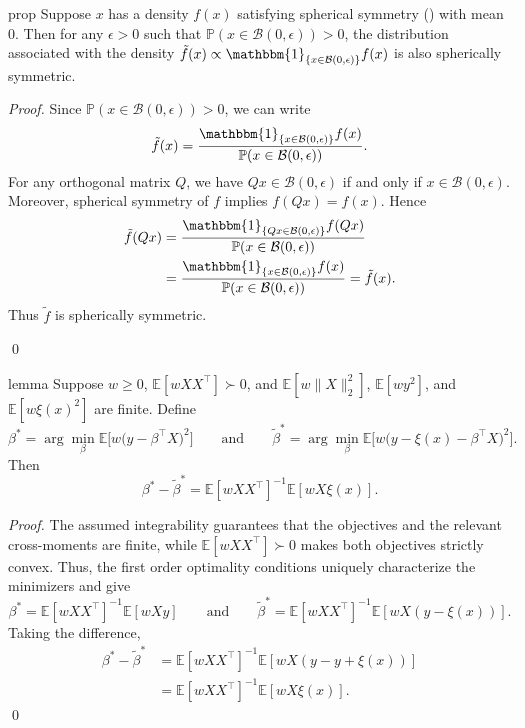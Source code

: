 \documentclass[11pt]{article}
\begin{document}
\begin{appendices}
\begin{restatable}{prop}{} \label{prop: conditional spherical symmetry}
    Suppose $x$ has a density $f(x)$ satisfying spherical symmetry () with mean $0$. Then for any $\epsilon > 0$ such that $\mathbb{P}(x\in\mathcal{B}(0,\epsilon))>0$, the distribution associated with the density $\tilde{f}(x) \propto \mathbbm{1}_{\{x \in \mathcal{B}(0, \epsilon)\}}f(x)$ is also spherically symmetric.
\end{restatable}
\noindent \textit{Proof.} Since $\mathbb{P}(x\in\mathcal{B}(0,\epsilon))>0$, we can write
\[
    \tilde f(x)
    =
    \frac{\mathbbm{1}_{\{x\in\mathcal{B}(0,\epsilon)\}}f(x)}
    {\mathbb{P}(x\in\mathcal{B}(0,\epsilon))}.
\]
For any orthogonal matrix $Q$, we have $Qx\in\mathcal{B}(0,\epsilon)$ if and only if $x\in\mathcal{B}(0,\epsilon)$. Moreover, spherical symmetry of $f$ implies $f(Qx)=f(x)$. Hence
\begin{align*}
    \tilde f(Qx)
    &=
    \frac{\mathbbm{1}_{\{Qx\in\mathcal{B}(0,\epsilon)\}}f(Qx)}
    {\mathbb{P}(x\in\mathcal{B}(0,\epsilon))} \\
    &=
    \frac{\mathbbm{1}_{\{x\in\mathcal{B}(0,\epsilon)\}}f(x)}
    {\mathbb{P}(x\in\mathcal{B}(0,\epsilon))}
    =
    \tilde f(x).
\end{align*}
Thus $\tilde f$ is spherically symmetric.

\qed{}

\begin{restatable}[Perturbation]{lemma}{} \label{lemma: perturbation}
    Suppose $w\geq 0$, $\mathbb{E}[wXX^{\top}] \succ 0$, and $\mathbb{E}[w\|X\|_2^2]$, $\mathbb{E}[wy^2]$, and $\mathbb{E}[w\xi(x)^2]$ are finite. Define  
    \[\beta^* = \arg\min_{\beta}\mathbb{E}\big[w\big(y - \beta^{\top}X\big)^2\big] \qquad \text{and} \qquad \tilde{\beta}^* = \arg\min_{\beta}\mathbb{E}\big[w\big(y - \xi(x) - \beta^{\top}X\big)^2\big].\]
    Then
    \[\beta^* - \tilde{\beta}^* = \mathbb{E}[wXX^{\top}]^{-1}\mathbb{E}[wX\xi(x)].\]
\end{restatable}
\noindent \textit{Proof.} The assumed integrability guarantees that the objectives and the relevant cross-moments are finite, while $\mathbb{E}[wXX^\top]\succ0$ makes both objectives strictly convex. Thus, the first order optimality conditions uniquely characterize the minimizers and give
\[
    \beta^* = \mathbb{E}[wXX^{\top}]^{-1}\mathbb{E}[wXy]
    \qquad \text{and} \qquad
    \tilde{\beta}^* = \mathbb{E}[wXX^{\top}]^{-1}\mathbb{E}[wX(y-\xi(x))].
\]
Taking the difference,
\begin{align*}
    \beta^* - \tilde{\beta}^*
    &= \mathbb{E}[wXX^{\top}]^{-1}\mathbb{E}[wX(y-y+\xi(x))] \\
    &= \mathbb{E}[wXX^{\top}]^{-1}\mathbb{E}[wX\xi(x)].
\end{align*}
\qed{}



\end{appendices}
\end{document}
